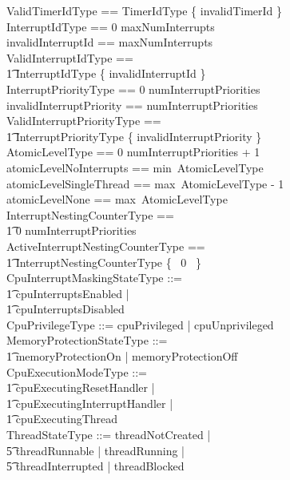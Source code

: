 \documentclass[11pt,letterpaper,twoside,openany]{book}
\begin{document}
\begin{zed}
    ValidTimerIdType == TimerIdType \setminus \{ invalidTimerId \} \\
    InterruptIdType == 0 \upto maxNumInterrupts \\
    invalidInterruptId == maxNumInterrupts \\
    ValidInterruptIdType == \\
    \t1 InterruptIdType \setminus \{ invalidInterruptId \} \\
    InterruptPriorityType == 0 \upto numInterruptPriorities \\
    invalidInterruptPriority == numInterruptPriorities \\
    ValidInterruptPriorityType == \\
    \t1 InterruptPriorityType \setminus \{ invalidInterruptPriority \} \\
    AtomicLevelType == 0 \upto numInterruptPriorities + 1 \\
    atomicLevelNoInterrupts == min~AtomicLevelType \\
    atomicLevelSingleThread == max~AtomicLevelType - 1 \\
    atomicLevelNone == max~AtomicLevelType \\
    InterruptNestingCounterType == \\
    \t1 0 \upto numInterruptPriorities \\
    ActiveInterruptNestingCounterType == \\
    \t1 InterruptNestingCounterType \setminus \{~ 0 ~\} \\
    CpuInterruptMaskingStateType ::= \\
    \t1 cpuInterruptsEnabled | \\
    \t1 cpuInterruptsDisabled \\
    CpuPrivilegeType ::= cpuPrivileged | cpuUnprivileged \\
    MemoryProtectionStateType ::= \\
    \t1 memoryProtectionOn | memoryProtectionOff \\
    CpuExecutionModeType ::= \\
    \t1 cpuExecutingResetHandler | \\
    \t1 cpuExecutingInterruptHandler | \\
    \t1 cpuExecutingThread \\
    ThreadStateType ::= threadNotCreated | \\
    \t5 threadRunnable | threadRunning | \\
    \t5 threadInterrupted | threadBlocked \\

\end{zed}
\end{document}
